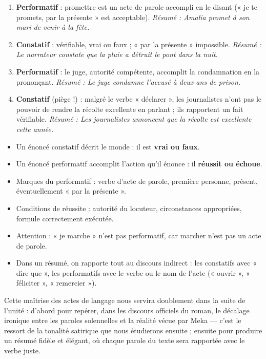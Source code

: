 \documentclass[11pt]{article}
\newcommand{\cle}[1]{{\popxbold\color{popdark}#1}}
\begin{document}
\begin{corrige}
\begin{enumerate}
\item \textbf{Performatif} : promettre est un acte de parole accompli en le disant (« je te promets, par la présente » est acceptable). \emph{Résumé : Amalia promet à son mari de venir à la fête.}
\item \textbf{Constatif} : vérifiable, vrai ou faux ; « par la présente » impossible. \emph{Résumé : Le narrateur constate que la pluie a détruit le pont dans la nuit.}
\item \textbf{Performatif} : le juge, autorité compétente, accomplit la condamnation en la prononçant. \emph{Résumé : Le juge condamne l'accusé à deux ans de prison.}
\item \textbf{Constatif} (piège !) : malgré le verbe « déclarer », les journalistes n'ont pas le pouvoir de rendre la récolte excellente en parlant ; ils rapportent un fait vérifiable. \emph{Résumé : Les journalistes annoncent que la récolte est excellente cette année.}
\end{enumerate}
\end{corrige}

\begin{aretenir}
\begin{itemize}
\item Un énoncé \cle{constatif} décrit le monde : il est \textbf{vrai ou faux}.
\item Un énoncé \cle{performatif} accomplit l'action qu'il énonce : il \textbf{réussit ou échoue}.
\item Marques du performatif : verbe d'acte de parole, première personne, présent, éventuellement « par la présente ».
\item Conditions de réussite : autorité du locuteur, circonstances appropriées, formule correctement exécutée.
\item Attention : « je marche » n'est pas performatif, car marcher n'est pas un acte de parole.
\item Dans un résumé, on rapporte tout au discours indirect : les constatifs avec « dire que », les performatifs avec le verbe ou le nom de l'acte (« ouvrir », « féliciter », « remercier »).
\end{itemize}
\end{aretenir}

Cette maîtrise des actes de langage nous servira doublement dans la suite de l'unité : d'abord pour repérer, dans les discours officiels du roman, le décalage ironique entre les paroles solennelles et la réalité vécue par Meka — c'est le ressort de la tonalité satirique que nous étudierons ensuite ; ensuite pour produire un résumé fidèle et élégant, où chaque parole du texte sera rapportée avec le verbe juste.
\end{document}
